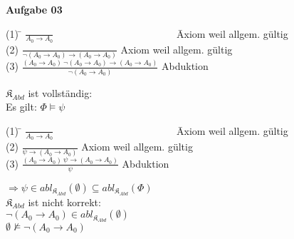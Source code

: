 \documentclass[a4paper,10pt]{article}
\begin{document}
	\textbf{Aufgabe 03}\\
	
	\begin{compactenum} [(a)]
		\item \begin{tabbing}
			(1) \= $ \frac{}{A_0 \rightarrow A_0} \qquad \qquad \qquad \qquad \qquad \qquad $ \= Axiom weil allgem. gültig\\
			(2) \> $ \frac{}{\lnot (A_0 \rightarrow A_0)\rightarrow (A_0 \rightarrow A_0)} $ \> Axiom weil allgem. gültig\\
			(3) \> $ \frac{(A_0 \rightarrow A_0)\ \lnot(A_0 \rightarrow A_0) \rightarrow (A_0 \rightarrow A_0)}{\lnot (A_0 \rightarrow A_0)} $ \> Abduktion
		\end{tabbing}
		\item $ \mathfrak{K}_{Abd} $ ist vollständig:\\
		Es gilt: $ \Phi \models \psi $
		\begin{tabbing}
			(1) \= $ \frac{}{A_0 \rightarrow A_0} \qquad \qquad \qquad \qquad \qquad \qquad $ \= Axiom weil allgem. gültig\\
			(2) \> $ \frac{}{\psi \rightarrow (A_0 \rightarrow A_0)} $ \> Axiom weil allgem. gültig\\
			(3) \> $ \frac{(A_0 \rightarrow A_0)\ \psi \rightarrow (A_0 \rightarrow A_0)}{\psi} $ \> Abduktion
		\end{tabbing}
		$ \Rightarrow \psi \in abl_{\mathfrak{K}_{Abd}}(\emptyset) \subseteq abl_{\mathfrak{K}_{Abd}}(\Phi)$\\
		$ \mathfrak{K}_{Abd} $ ist nicht korrekt:\\
		$ \lnot (A_0 \rightarrow A_0) \in abl_{\mathfrak{K}_{Abd}}(\emptyset) $\\
		$ \emptyset \not\models \lnot (A_0 \rightarrow A_0) $
	\end{compactenum}
	
	
\end{document}
